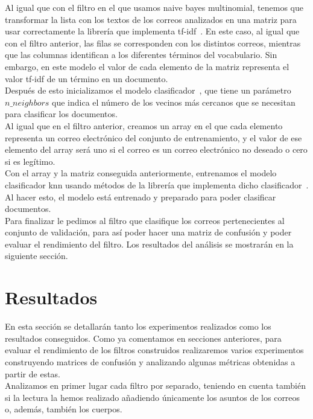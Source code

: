 \documentclass[conference,a4paper]{IEEEtran}
\begin{document}
Al igual que con el filtro en el que usamos naive bayes multinomial, tenemos que transformar la lista con los textos de los correos analizados en una matriz para usar correctamente la librería que implementa tf-idf~\cite{b13}. En este caso, al igual que con el filtro anterior, las filas se corresponden con los distintos correos, mientras que las columnas identifican a los diferentes términos del vocabulario. Sin embargo, en este modelo el valor de cada elemento de la matriz representa el valor tf-idf de un término en un documento. \\

Después de esto inicializamos el modelo clasificador~\cite{b14}, que tiene un parámetro $n\_neighbors$ que indica el número de los vecinos más cercanos que se necesitan para clasificar los documentos. \\

Al igual que en el filtro anterior, creamos un array en el que cada elemento representa un correo electrónico del conjunto de entrenamiento, y el valor de ese elemento del array será uno si el correo es un correo electrónico no deseado o cero si es legítimo. \\

Con el array y la matriz conseguida anteriormente, entrenamos el modelo clasificador knn usando métodos de la librería que implementa dicho clasificador~\cite{b14}. Al hacer esto, el modelo está entrenado y preparado para poder clasificar documentos.\\

Para finalizar le pedimos al filtro que clasifique los correos pertenecientes al conjunto de validación, para así poder hacer una matriz de confusión y poder evaluar el rendimiento del filtro. Los resultados del análisis se mostrarán en la siguiente sección. \\

\section{Resultados}

En esta sección se detallarán tanto los experimentos realizados como los
resultados conseguidos. Como ya comentamos en secciones anteriores, para evaluar el rendimiento de los filtros construidos realizaremos varios experimentos construyendo matrices de confusión y analizando algunas métricas obtenidas a partir de estas. \\

Analizamos en primer lugar cada filtro por separado, teniendo en cuenta también si la lectura la hemos realizado añadiendo únicamente los asuntos de los correos o, además, también los cuerpos. \\
\end{document}
